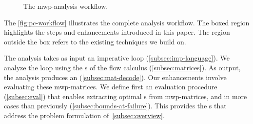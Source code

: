 \begin{figure}[H]
\centering
{}

\caption[The mwp-analysis workflow]
    {The mwp-analysis workflow.}
\label{fig:pc-workflow}
\end{figure}

The \autoref{fig:pc-workflow} illustrates the complete analysis workflow.
The boxed region highlights the steps and enhancements introduced in this paper.
The region outside the box refers to the existing techniques we build on.

The analysis takes as input an imperative loop 
(\autoref{subsec:imp-language}). We analyze the loop using the s of the flow calculus (\autoref{subsec:matrices}). As
output, the analysis produces an \emph{}
(\autoref{subsec:mat-decode}). Our enhancements involve {evaluating} these
mwp-matrices. We define first an {evaluation procedure} (\autoref{subsec:eval})
that enables extracting optimal s from mwp-matrices, and in more
cases than previously (\autoref{subsec:bounds-at-failure}). This provides the
s that address the problem formulation
of~\autoref{subsec:overview}.


